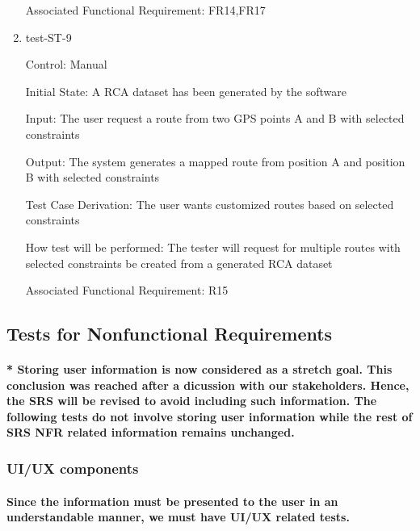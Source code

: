 \documentclass[12pt, titlepage]{article}
\begin{document}
\begin{enumerate}
Associated Functional Requirement: FR14,FR17

\item{test-ST-9\\}

Control: Manual
					
Initial State: A RCA dataset has been generated by the software
					
Input: The user request a route from two GPS points A and B with selected constraints 
					
Output: The system generates a mapped route from position A and position B with selected constraints

Test Case Derivation: The user wants customized routes based on selected constraints 

How test will be performed: The tester will request for multiple routes with selected constraints be created from a generated RCA dataset

Associated Functional Requirement: R15

\end{enumerate}


\subsection{Tests for Nonfunctional Requirements}

\paragraph{* Storing user information is now considered as a stretch goal. This conclusion was reached after a dicussion with our stakeholders. Hence, the SRS will be revised to avoid including such information. The following tests do not involve storing user information while the rest of SRS NFR related information remains unchanged. }
\subsubsection{UI/UX components}
\paragraph{Since the information must be presented to the user in an understandable manner, we must have UI/UX related tests.}
\end{document}
